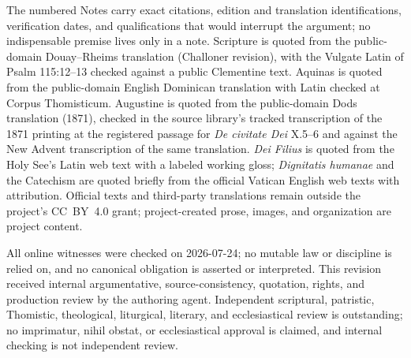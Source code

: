 The numbered Notes carry exact citations, edition and translation identifications, verification dates, and qualifications that would interrupt the argument; no indispensable premise lives only in a note. Scripture is quoted from the public-domain Douay--Rheims translation (Challoner revision), with the Vulgate Latin of Psalm 115:12--13 checked against a public Clementine text. Aquinas is quoted from the public-domain English Dominican translation with Latin checked at Corpus Thomisticum. Augustine is quoted from the public-domain Dods translation (1871), checked in the source library's tracked transcription of the 1871 printing at the registered passage for \emph{De civitate Dei} X.5--6 and against the New Advent transcription of the same translation. \emph{Dei Filius} is quoted from the Holy See's Latin web text with a labeled working gloss; \emph{Dignitatis humanae} and the Catechism are quoted briefly from the official Vatican English web texts with attribution. Official texts and third-party translations remain outside the project's CC~BY~4.0 grant; project-created prose, images, and organization are project content.

All online witnesses were checked on 2026-07-24; no mutable law or discipline is relied on, and no canonical obligation is asserted or interpreted. This revision received internal argumentative, source-consistency, quotation, rights, and production review by the authoring agent. Independent scriptural, patristic, Thomistic, theological, liturgical, literary, and ecclesiastical review is outstanding; no imprimatur, nihil obstat, or ecclesiastical approval is claimed, and internal checking is not independent review.
